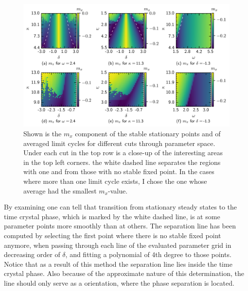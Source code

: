 \begin{figure}[H]
    \hspace*{-1.2cm}
    \includegraphics[scale=1]{pictures/stable_fixp_extended_withline_dashed.png}
    \caption{Shown is the $m_x$ component of the stable stationary points and of averaged limit cycles for different cuts through parameter space. Under each cut in the top row is a close-up of the interesting areas in the top left corners. the white dashed line separates the regions with one and from those with no stable fixed point. In the cases where more than one limit cycle exists, I chose the one whose average had the smallest $m_x$-value.}
    \label{fig:fixedpoint_colormap}
\end{figure}
By examining  one can tell that transition from stationary steady states to the time crystal phase, which is marked by the white dashed line, is at some parameter points more smoothly than at others. The separation line has been computed by selecting the first point where there is no stable fixed point anymore, when passing through each line of the evaluated parameter grid in decreasing order of $\delta$, and fitting a polynomial of 4th degree to those points. Notice that as a result of this method the separation line lies inside the time crystal phase. Also because of the approximate nature of this determination, the line should only serve as a orientation, where the phase separation is located.\\\\
